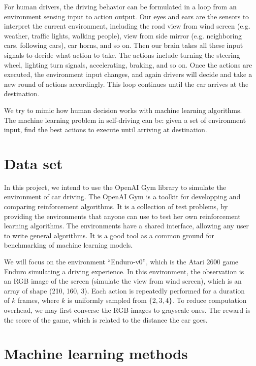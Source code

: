 \documentclass[a4paper]{article}
\begin{document}
For human drivers, the driving behavior can be formulated in a loop from an environment sensing input to action output. Our eyes and ears are the sensors to interpret the current environment, including the road view from wind screen (e.g. weather, traffic lights, walking people), view from side mirror (e.g. neighboring cars, following cars), car horns, and so on. Then our brain takes all these input signals to decide what action to take. The actions include turning the steering wheel, lighting turn signals, accelerating, braking, and so on. Once the actions are executed, the environment input changes, and again drivers will decide and take a new round of actions accordingly. This loop continues until the car arrives at the destination. 

We try to mimic how human decision works with machine learning algorithms. The machine learning problem in self-driving can be: given a set of environment input, find the best actions to execute until arriving at destination.


\section{Data set}

In this project, we intend to use the OpenAI Gym library to simulate the environment of car driving. The OpenAI Gym \cite{gym} is a toolkit for developping and comparing reinforcement algorithms. It is a collection of test problems, by providing the environments that anyone can use to test her own reinforcement learning algorithms. The environments have a shared interface, allowing any user to write general algorithms. It is a good tool as a common ground for benchmarking of machine learning models.

We will focus on the environment ``Enduro-v0'', which is the Atari 2600 game Enduro simulating a driving experience. In this environment, the observation is an RGB image of the screen (simulate the view from wind screen), which is an array of shape (210, 160, 3). Each action is repeatedly performed for a duration of $k$ frames, where $k$ is uniformly sampled from $\{2, 3, 4\}$. To reduce computation overhead, we may first converse the RGB images to grayscale ones. The reward is the score of the game, which is related to the distance the car goes. 

\section{Machine learning methods}
\end{document}
